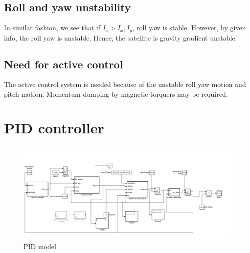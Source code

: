 \documentclass[10pt,a4paper]{report}
\begin{document}
\section{Roll and yaw unstability}
In similar fashion, we see that if $ I_{z}>I_{x},I_{y} $, roll yaw is stable. However, by given info, the roll yaw is unstable. Hence, the satellite is gravity gradient unstable. 
\section{Need for active control}
The active control system is needed because of the unstable roll yaw motion and pitch motion. Momentum dumping by magnetic torquers may be required.
\chapter{PID controller}
\begin{figure}[H]
\centering
\includegraphics[scale=0.3]{Untitled1.png}
\caption{PID model}
\end{figure}
\end{document}
